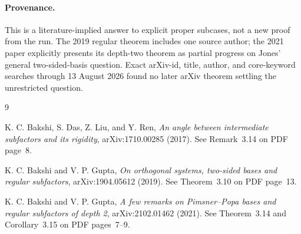 \documentclass[11pt]{article}
\begin{document}
\paragraph{Provenance.}
This is a literature-implied answer to explicit proper subcases, not a new
proof from the run.  The 2019 regular theorem includes one source author; the
2021 paper explicitly presents its depth-two theorem as partial progress on
Jones' general two-sided-basis question.  Exact arXiv-id, title, author, and
core-keyword searches through 13 August 2026 found no later arXiv theorem
settling the unrestricted question.

\begin{thebibliography}{9}
\raggedright
{}
K. C. Bakshi, S. Das, Z. Liu, and Y. Ren,
\emph{An angle between intermediate subfactors and its rigidity},
arXiv:1710.00285 (2017).  See Remark~3.14 on PDF page~8.

K. C. Bakshi and V. P. Gupta,
\emph{On orthogonal systems, two-sided bases and regular subfactors},
arXiv:1904.05612 (2019).  See Theorem~3.10 on PDF page~13.

K. C. Bakshi and V. P. Gupta,
\emph{A few remarks on Pimsner--Popa bases and regular subfactors of depth 2},
arXiv:2102.01462 (2021).  See Theorem~3.14 and Corollary~3.15 on PDF pages~7--9.
\end{thebibliography}
\end{document}
